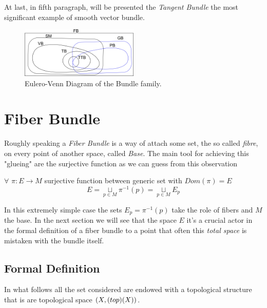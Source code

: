 \documentclass[a4paper,12pt]{scrartcl}    %
\begin{document}
At last, in fifth paragraph, will be presented the \emph{Tangent Bundle} the most significant example of smooth vector bundle.


\begin{figure}[h!]
  \caption{Eulero-Venn Diagram of the Bundle family.}
   	\includegraphics[width=0.5\textwidth]{Pictures/EuleroVenn_Bundles} 
  \centering
\end{figure}



\newpage
\section{Fiber Bundle}
Roughly speaking a \emph{Fiber Bundle} is a way of attach some set, the so called \emph{fibre}, on every point of another space, called \emph{Base}.
The main tool for achieving this "glueing" are the surjective function as we can guess from this observation

\begin{observation}\label{oss:BasicBundle}
$\forall$ $\pi : E \rightarrow M $ surjective function between generic set with $Dom(\pi)=E$
$$ E = \underset{p \in M}{\sqcup} \pi^{-1}(p)= \underset{p \in M}{\sqcup} E_{p}$$
\end{observation}
In this extremely simple case the sets $E_{p} =\pi^{-1}(p)$ take the role of fibers and $M$ the base. In the next section we will see that the space $E$ it's a crucial actor in the formal definition of a fiber bundle to a point that often this \emph{total space} is mistaken with the bundle itself. \cite{freed}


\subsection{Formal Definition}
\begin{remark}
In what follows all the set considered are endowed with a topological structure that is are topological space  $(X,\textrm(top)(X))$.
\end{remark}
\end{document}
